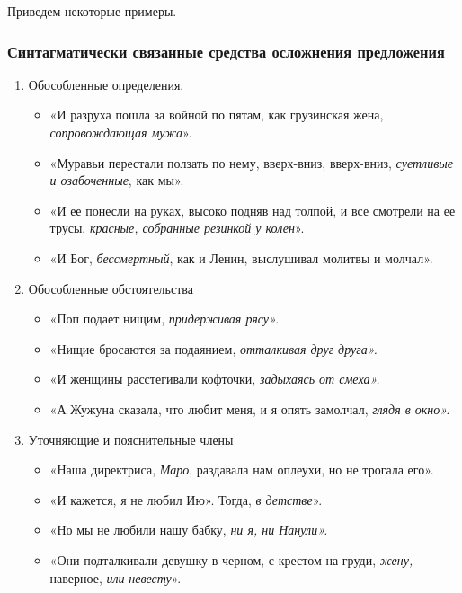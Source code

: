 \documentclass{kursa4}
\begin{document}
{        Приведем некоторые примеры.

        \subsubsection{Синтагматически связанные средства осложнения предложения}

          \begin{enumerate}
            \item Обособленные определения.
            \begin{itemize}
              \item «И разруха пошла за войной по пятам, как грузинская жена, \textit{сопровождающая мужа}».
              \item «Муравьи перестали ползать по нему, вверх-вниз, вверх-вниз, \textit{суетливые и озабоченные}, как мы».
              \item «И ее понесли на руках, высоко подняв над толпой,
              и все смотрели на ее трусы, \textit{красные,
              собранные резинкой у колен}».
              \item «И Бог, \textit{бессмертный}, как и Ленин, выслушивал молитвы и молчал».
            \end{itemize}

            \item Обособленные обстоятельства
            \begin{itemize}
              \item «Поп подает нищим, \textit{придерживая рясу».}
              \item «Нищие бросаются за подаянием, \textit{отталкивая друг друга».}
              \item «И женщины расстегивали кофточки, \textit{задыхаясь от смеха».}
              \item «А Жужуна сказала, что любит меня, и я опять замолчал,\textit{
              глядя в окно».}
            \end{itemize}

            \item Уточняющие и пояснительные члены
            \begin{itemize}
              \item «Наша директриса, \textit{Маро}, раздавала нам оплеухи, но не
              трогала его».
              \item «И кажется, я не любил Ию». Тогда, \textit{в детстве}».
              \item «Но мы не любили нашу бабку, \textit{ни я, ни Нанули».}
              \item «Они подталкивали девушку в черном, с крестом на груди, \textit{жену,} наверное, \textit{или} \textit{невесту}».
            \end{itemize}
        

\end{enumerate}}
\end{document}
